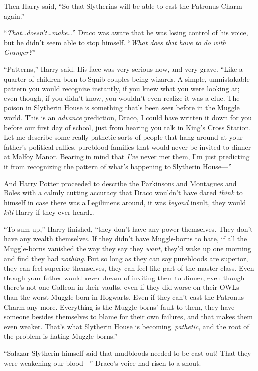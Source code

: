 Then Harry said, “So that Slytherins will be able to cast the Patronus Charm again.”

“\emph{That…doesn’t…make…}” Draco was aware that he was losing control of his voice, but he didn’t seem able to stop himself. “\emph{What does that have to do with Granger?}”

“Patterns,” Harry said. His face was very serious now, and very grave. “Like a quarter of children born to Squib couples being wizards. A simple, unmistakable pattern you would recognize instantly, if you knew what you were looking at; even though, if you didn’t know, you wouldn’t even realize it was a clue. The poison in Slytherin House is something that’s been seen before in the Muggle world. This is an \emph{advance} prediction, Draco, I could have written it down for you before our first day of school, just from hearing you talk in King’s Cross Station. Let me describe some really pathetic sorts of people that hang around at your father’s political rallies, pureblood families that would never be invited to dinner at Malfoy Manor. Bearing in mind that \emph{I’ve} never met them, I’m just predicting it from recognizing the pattern of what’s happening to Slytherin House—”

And Harry Potter proceeded to describe the Parkinsons and Montagues and Boles with a calmly cutting accuracy that Draco wouldn’t have dared \emph{think} to himself in case there was a Legilimens around, it was \emph{beyond} insult, they would \emph{kill} Harry if they ever heard…

“To sum up,” Harry finished, “they don’t have any power themselves. They don’t have any wealth themselves. If they didn’t have Muggle-borns to hate, if all the Muggle-borns vanished the way they say they \emph{want}, they’d wake up one morning and find they had \emph{nothing}. But so long as they can say purebloods are superior, they can feel superior themselves, they can feel like part of the master class. Even though your father would never dream of inviting them to dinner, even though there’s not one Galleon in their vaults, even if they did worse on their OWLs than the worst Muggle-born in Hogwarts. Even if they can’t cast the Patronus Charm any more. Everything is the Muggle-borns’ fault to them, they have someone besides themselves to blame for their own failures, and that makes them even weaker. That’s what Slytherin House is becoming, \emph{pathetic}, and the root of the problem is hating Muggle-borns.”

“Salazar Slytherin himself said that mudbloods needed to be cast out! That they were weakening our blood—” Draco’s voice had risen to a shout.

